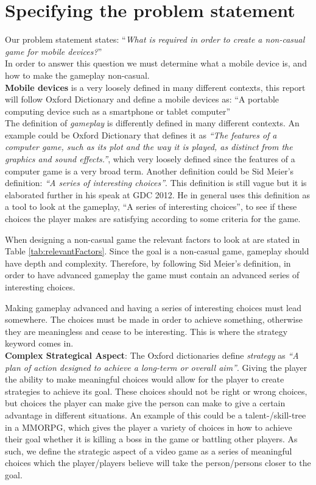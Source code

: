 \section{Specifying the problem statement}
Our problem statement states: ``\textit{What is required in order to create a non-casual game for mobile devices?}''\\
In order to answer this question we must determine what a mobile device is, and how to make the gameplay non-casual.\\
\textbf{Mobile devices} is a very loosely defined in many different contexts, this report will follow Oxford Dictionary and define a mobile devices as: ``A portable computing device such as a smartphone or tablet computer''\cite{mobileOx}\\

The definition of \textit{gameplay} is differently defined in many different contexts. 
An example could be Oxford Dictionary that defines it as \textit{``The features of a computer game, such as its plot and the way it is played, as distinct from the graphics and sound effects.''}\cite{gameplayOx}, which very loosely defined since the features of a computer game is a very broad term. 
Another definition could be Sid Meier's definition: \textit{``A series of interesting choices''}\cite{GDC2012}. 
This definition is still vague but it is elaborated further in his speak at GDC 2012.\cite{GDC2012}
He in general uses this definition as a tool to look at the gameplay, ``A series of interesting choices'', to see if these choices the player makes are satisfying according to some criteria for the game.

When designing a non-casual game the relevant factors to look at are stated in Table \ref{tab:relevantFactors}.
Since the goal is a non-casual game, gameplay should have depth and complexity.
Therefore, by following Sid Meier's definition, in order to have advanced gameplay the game must contain an advanced series of interesting choices.

Making gameplay advanced and having a series of interesting choices must lead somewhere.
The choices must be made in order to achieve something, otherwise they are meaningless and cease to be interesting.
This is where the strategy keyword comes in.\\

\textbf{Complex Strategical Aspect}: The Oxford dictionaries define \textit{strategy} as \textit{``A plan of action designed to achieve a long-term or overall aim''}.\cite{strategyOx}
Giving the player the ability to make meaningful choices would allow for the player to create strategies to achieve its goal.
These choices should not be right or wrong choices, but choices the player can make give the person can make to give a certain advantage in different situations.
An example of this could be a talent-/skill-tree in a MMORPG, which gives the player a variety of choices in how to achieve their goal whether it is killing a boss in the game or battling other players.
As such, we define the strategic aspect of a video game as a series of meaningful choices which the player/players believe will take the person/persons closer to the goal.


